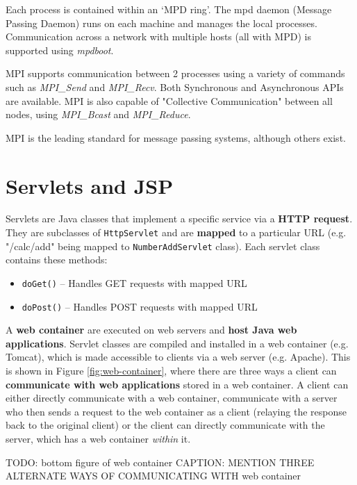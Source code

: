 \documentclass{article}
\begin{document}
Each process is contained within an `MPD ring'. The mpd daemon (Message Passing Daemon) runs on each machine and manages the local processes. Communication across a network with multiple hosts (all with MPD) is supported using \textit{mpdboot}.

MPI supports communication between 2 processes using a variety of commands such as \textit{MPI\_Send} and \textit{MPI\_Recv}. Both Synchronous and Asynchronous APIs are available. MPI is also capable of "Collective Communication" between all nodes, using \textit{MPI\_Bcast} and \textit{MPI\_Reduce}.

MPI is the leading standard for message passing systems, although others exist.

\section{Servlets and JSP}

Servlets are Java classes that implement a specific service via a \textbf{HTTP request}. They are subclasses of \texttt{HttpServlet} and are \textbf{mapped} to a particular URL (e.g. "/calc/add" being mapped to \texttt{NumberAddServlet} class). Each servlet class contains these methods:
\begin{itemize}
	\item \texttt{doGet()} -- Handles GET requests with mapped URL
	\item \texttt{doPost()} -- Handles POST requests with mapped URL
\end{itemize}

A \textbf{web container} are executed on web servers and \textbf{host Java web applications}. Servlet classes are compiled and installed in a web container (e.g. Tomcat), which is made accessible to clients via a web server (e.g. Apache). This is shown in Figure \ref{fig:web-container}, where there are three ways a client can \textbf{communicate with web applications} stored in a web container. A client can either directly communicate with a web container, communicate with a server who then sends a request to the web container as a client (relaying the response back to the original client) or the client can directly communicate with the server, which has a web container \textit{within} it.

TODO: bottom figure of web container
CAPTION: MENTION THREE ALTERNATE WAYS OF COMMUNICATING WITH web container
\end{document}
